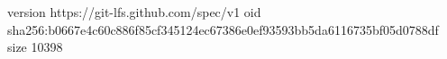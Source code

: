 version https://git-lfs.github.com/spec/v1
oid sha256:b0667e4c60c886f85cf345124ec67386e0ef93593bb5da6116735bf05d0788df
size 10398
